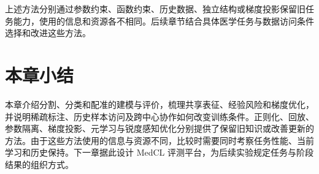 上述方法分别通过参数约束、函数约束、历史数据、独立结构或梯度投影保留旧任务能力，使用的信息和资源各不相同。后续章节结合具体医学任务与数据访问条件选择和改进这些方法。


\section{本章小结}
\label{sec:foundations-summary}

本章介绍分割、分类和配准的建模与评价，梳理共享表征、经验风险和梯度优化，并说明稀疏标注、历史样本访问及跨中心协作如何改变训练条件。正则化、回放、参数隔离、梯度投影、元学习与锐度感知优化分别提供了保留旧知识或改善更新的方法。由于这些方法使用的信息与资源不同，比较时需要同时考察任务性能、当前学习和历史保持。下一章据此设计 MedCL 评测平台，为后续实验规定任务与阶段结果的组织方式。